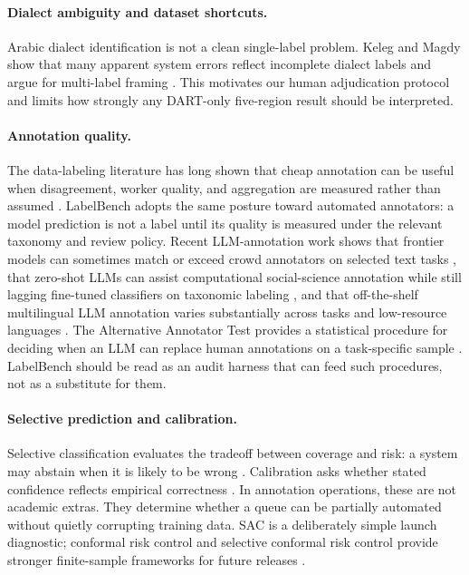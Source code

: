 \documentclass[10pt,twocolumn]{article}
\begin{document}
\paragraph{Dialect ambiguity and dataset shortcuts.}
Arabic dialect identification is not a clean single-label problem. Keleg and
Magdy show that many apparent system errors reflect incomplete dialect labels
and argue for multi-label framing \citep{keleg2023scrutiny}. This motivates
our human adjudication protocol and limits how strongly any DART-only
five-region result should be interpreted.

\paragraph{Annotation quality.}
The data-labeling literature has long shown that cheap annotation can be
useful when disagreement, worker quality, and aggregation are measured rather
than assumed \citep{snow2008cheap,dawid1979maximum}. LabelBench adopts the
same posture toward automated annotators: a model prediction is not a label
until its quality is measured under the relevant taxonomy and review policy.
Recent LLM-annotation work shows that frontier models can sometimes match or
exceed crowd annotators on selected text tasks \citep{gilardi2023chatgpt}, that
zero-shot LLMs can assist computational social-science annotation while still
lagging fine-tuned classifiers on taxonomic labeling \citep{ziems2024large},
and that off-the-shelf multilingual LLM annotation varies substantially across
tasks and low-resource languages \citep{bhat2023large}. The Alternative
Annotator Test provides a statistical procedure for deciding when an LLM can
replace human annotations on a task-specific sample
\citep{calderon2025alttest}. LabelBench should be read as an audit harness
that can feed such procedures, not as a substitute for them.

\paragraph{Selective prediction and calibration.}
Selective classification evaluates the tradeoff between coverage and risk:
a system may abstain when it is likely to be wrong \citep{geifman2017selective}.
Calibration asks whether stated confidence reflects empirical correctness
\citep{guo2017calibration}. In annotation operations, these are not academic
extras. They determine whether a queue can be partially automated without
quietly corrupting training data. SAC is a deliberately simple launch
diagnostic; conformal risk control and selective conformal risk control provide
stronger finite-sample frameworks for future releases
\citep{angelopoulos2024conformal,xu2025selective}.
\end{document}
